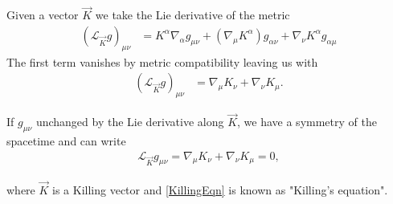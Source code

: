 \documentclass[10pt]{article}
\begin{document}
   Given a vector $\vec K$ we take the Lie derivative of the metric 
   \begin{align}
   \left(\mathcal{L}_{\vec K} g \right)_{\mu \nu} &= K^\alpha \nabla_\alpha g_{\mu \nu} +\left( \nabla_\mu K^\alpha\right) g_{\alpha \nu} + \nabla _\nu K^\alpha g_{\alpha \mu}
   \end{align}
   The first term vanishes by metric compatibility leaving us with 
       \begin{align}
   \left(\mathcal{L}_{\vec K} g \right)_{\mu \nu} &= \nabla_\mu K_\nu + \nabla_\nu K_\mu.
   \end{align}
   
      
   If $g_{\mu \nu}$ unchanged by the Lie derivative along $\vec K$, we have a symmetry of the spacetime and can write 
   \begin{align}\label{KillingEqn}
      \mathcal{L}_{\vec K} g_{\mu \nu} = \nabla_\mu K_\nu + \nabla_\nu K_\mu= 0, 
   \end{align}
   
   where $\vec K$ is a Killing vector and \ref{KillingEqn} is known as "Killing's equation". 
   
\end{document}
